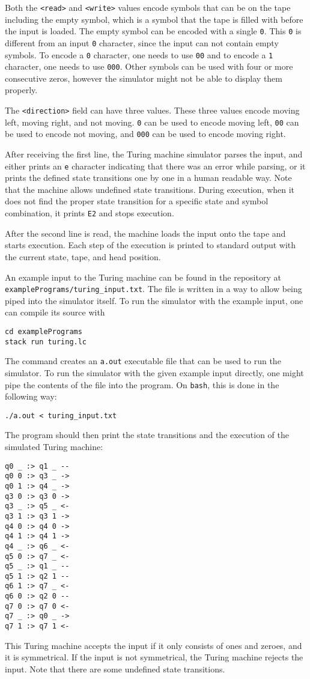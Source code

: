 \documentclass[12pt]{article}
\begin{document}
Both the \verb$<read>$ and \verb$<write>$ values encode symbols that can be on
the tape including the empty symbol, which is a symbol that the tape is filled
with before the input is loaded. The empty symbol can be encoded with a single
\verb$0$. This \verb$0$ is different from an input \verb$0$ character, since the
input can not contain empty symbols. To encode a \verb$0$ character, one needs
to use \verb$00$ and to encode a \verb$1$ character, one needs to use
\verb$000$. Other symbols can be used with four or more consecutive zeros,
however the simulator might not be able to display them properly.

The \verb$<direction>$ field can have three values. These three values encode
moving left, moving right, and not moving. \verb$0$ can be used to encode moving
left, \verb$00$ can be used to encode not moving, and \verb$000$ can be used to
encode moving right.

After receiving the first line, the Turing machine simulator parses the input,
and either prints an \verb$e$ character indicating that there was an error while
parsing, or it prints the defined state transitions one by one in a human
readable way. Note that the machine allows undefined state transitions. During
execution, when it does not find the proper state transition for a specific
state and symbol combination, it prints \verb$E2$ and stops execution.

After the second line is read, the machine loads the input onto the tape and
starts execution. Each step of the execution is printed to standard output with
the current state, tape, and head position.

\lstset{frame=lines}

An example input to the Turing machine can be found in the repository at\\
\verb$examplePrograms/turing_input.txt$. The file is written in a way to allow
being piped into the simulator itself. To run the simulator with the example
input, one can compile its source with
\begin{lstlisting}
cd examplePrograms
stack run turing.lc
\end{lstlisting}
The command creates an \verb$a.out$ executable file that can be used to run the
simulator. To run the simulator with the given example input directly, one might
pipe the contents of the file into the program. On \verb$bash$, this is done in
the following way:
\begin{lstlisting}
./a.out < turing_input.txt
\end{lstlisting}
The program should then print the state transitions and the execution of the 
simulated Turing machine:
\begin{lstlisting}
q0 _ :> q1 _ --
q0 0 :> q3 _ ->
q0 1 :> q4 _ ->
q3 0 :> q3 0 ->
q3 _ :> q5 _ <-
q3 1 :> q3 1 ->
q4 0 :> q4 0 ->
q4 1 :> q4 1 ->
q4 _ :> q6 _ <-
q5 0 :> q7 _ <-
q5 _ :> q1 _ --
q5 1 :> q2 1 --
q6 1 :> q7 _ <-
q6 0 :> q2 0 --
q7 0 :> q7 0 <-
q7 _ :> q0 _ ->
q7 1 :> q7 1 <-
\end{lstlisting}
This Turing machine accepts the input if it only consists of ones and zeroes,
and it is symmetrical. If the input is not symmetrical, the Turing machine
rejects the input. Note that there are some undefined state transitions.
\end{document}
